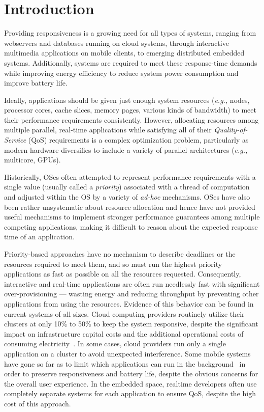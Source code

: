 \section{Introduction}

Providing responsiveness is a growing need for all types of systems,
ranging from webservers and databases running on cloud systems,
through interactive multimedia applications on mobile clients, to
emerging distributed embedded systems. Additionally, systems are
required to meet these response-time demands while improving energy
efficiency to reduce system power consumption and improve battery
life.

Ideally, applications should be given just enough system resources
(\emph{e.g.,}  nodes, processor cores, cache slices, memory pages,
various kinds of bandwidth) to meet their performance requirements
consistently.  However, allocating resources among multiple parallel,
real-time applications while satisfying all of their
\emph{Quality-of-Service} (QoS) requirements is a complex optimization
problem, particularly as modern hardware diversifies to include a
variety of parallel architectures (\emph{e.g.,} multicore, GPUs).

Historically, OSes often attempted to represent performance
requirements with a single value (usually called a \emph{priority})
associated with a thread of computation and adjusted within the OS by
a variety of \emph{ad-hoc} mechanisms.  OSes have also been rather
unsystematic about resource allocation and hence have not provided
useful mechanisms to implement stronger performance guarantees among
multiple competing applications, making it difficult to reason about
the expected response time of an application.

Priority-based approaches have no mechanism to describe deadlines or
the resources required to meet them, and so must run the highest
priority applications as fast as possible on all the resources
requested.  Consequently, interactive and real-time applications are
often run needlessly fast with significant over-provisioning ---
wasting energy and reducing throughput by preventing other
applications from using the resources.  Evidence of this behavior can
be found in current systems of all sizes.  Cloud computing providers
routinely utilize their clusters at only 10\% to 50\% to keep the
system responsive, despite the significant impact on infrastructure
capital costs and the additional operational costs of consuming
electricity~\cite{Barroso2009,Hennessy2011}.  In some cases, cloud
providers run only a single application on a cluster to avoid
unexpected interference.  Some mobile systems have gone so far as to
limit which applications can run in the background~\cite{iOsDev} in
order to preserve responsiveness and battery life, despite the obvious
concerns for the overall user experience.  In the embedded space,
realtime developers often use completely separate systems for each
application to ensure QoS, despite the high cost of this approach.

